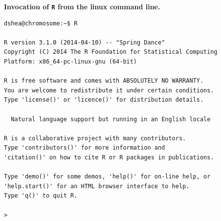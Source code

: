 \documentclass[a4paper,10pt]{article}
\begin{document}
\noindent\textbf{Invocation of \texttt{\footnotesize{R}} from the linux command line.}
\begin{lstlisting}
dshea@chromosome:~$ R

R version 3.1.0 (2014-04-10) -- "Spring Dance"
Copyright (C) 2014 The R Foundation for Statistical Computing
Platform: x86_64-pc-linux-gnu (64-bit)

R is free software and comes with ABSOLUTELY NO WARRANTY.
You are welcome to redistribute it under certain conditions.
Type 'license()' or 'licence()' for distribution details.

  Natural language support but running in an English locale

R is a collaborative project with many contributors.
Type 'contributors()' for more information and
'citation()' on how to cite R or R packages in publications.

Type 'demo()' for some demos, 'help()' for on-line help, or
'help.start()' for an HTML browser interface to help.
Type 'q()' to quit R.

> 
\end{lstlisting}
\end{document}
